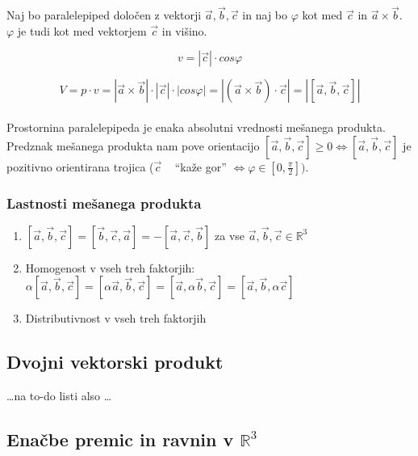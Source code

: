 \documentclass[a4paper,12pt]{article}
\begin{document}
Naj bo paralelepiped določen z vektorji $\vec{a}, \vec{b}, \vec{c}$ in naj bo $\varphi$ kot med $\vec{c}$ in $\vec{a} \times \vec{b}$. $\varphi$ je tudi kot med vektorjem $\vec{c}$ in višino. 

$$ v = |\vec{c}| \cdot cos\varphi $$

$$ V = p \cdot v = |\vec{a} \times \vec{b}| \cdot |\vec{c}| \cdot |cos\varphi| = | ( \vec{a} \times \vec{b}) \cdot \vec{c}| = | [ \vec{a}, \vec{b}, \vec{c}]| $$ \\

Prostornina paralelepipeda je enaka absolutni vrednosti mešanega produkta. Predznak mešanega produkta nam pove orientacijo $[ \vec{a}, \vec{b}, \vec{c}]\geq 0 \Leftrightarrow [ \vec{a}, \vec{b}, \vec{c}] $ je pozitivno orientirana trojica ($\vec{c}$ ~ ``kaže gor'' $ \Leftrightarrow \varphi \in [0, \frac{\pi}{2}])$. \\

\newpage

\begin{center}
\subsubsection{Lastnosti mešanega produkta}
\end{center}

\begin{enumerate}
\item $[ \vec{a}, \vec{b}, \vec{c}] = [ \vec{b},\vec{c},\vec{a}] = - [ \vec{a}, \vec{c},\vec{b} ] $ za vse $\vec{a}, \vec{b}, \vec{c} \in \mathbb{R}^3$
\item Homogenost v vseh treh faktorjih: $\alpha [ \vec{a}, \vec{b}, \vec{c}] = [ \alpha \vec{a}, \vec{b}, \vec{c}] = [ \vec{a}, \alpha \vec{b}, \vec{c}] = [ \vec{a}, \vec{b}, \alpha \vec{c}] $
\item Distributivnost v vseh treh faktorjih
\end{enumerate}

\newpage

\begin{center}
\subsection{Dvojni vektorski produkt}
\end{center}

\ldots na to-do listi also \ldots 

\newpage

\begin{center}
\section{Enačbe premic in ravnin v $\mathbb{R}^3$}
\end{center}
\end{document}

